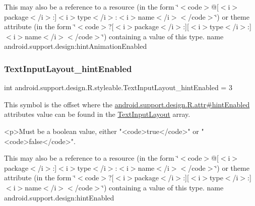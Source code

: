 This may also be a reference to a resource (in the form \char`\"{}$<$code$>$@\mbox{[}$<$i$>$package$<$/i$>$\+:\mbox{]}$<$i$>$type$<$/i$>$\+:$<$i$>$name$<$/i$>$$<$/code$>$\char`\"{}) or theme attribute (in the form \char`\"{}$<$code$>$?\mbox{[}$<$i$>$package$<$/i$>$\+:\mbox{]}\mbox{[}$<$i$>$type$<$/i$>$\+:\mbox{]}$<$i$>$name$<$/i$>$$<$/code$>$\char`\"{}) containing a value of this type.  name android.\+support.\+design\+:hint\+Animation\+Enabled \mbox{\label{classandroid_1_1support_1_1design_1_1R_1_1styleable_a164a51b99de4318938aea1e4cb2252a1}} 
\subsubsection{\texorpdfstring{Text\+Input\+Layout\+\_\+hint\+Enabled}{TextInputLayout\_hintEnabled}}
{\footnotesize\ttfamily int android.\+support.\+design.\+R.\+styleable.\+Text\+Input\+Layout\+\_\+hint\+Enabled = 3\hspace{0.3cm}{\ttfamily [static]}}

This symbol is the offset where the \hyperlink{classandroid_1_1support_1_1design_1_1R_1_1attr_afd69514a0f20d586a6ecea123884303c}{android.\+support.\+design.\+R.\+attr\#hint\+Enabled} attribute\textquotesingle{}s value can be found in the \hyperlink{classandroid_1_1support_1_1design_1_1R_1_1styleable_ae01fd2fce65dc8639f3898586b0cedcf}{Text\+Input\+Layout} array.

\begin{DoxyVerb}      <p>Must be a boolean value, either "<code>true</code>" or "<code>false</code>".
\end{DoxyVerb}
 

This may also be a reference to a resource (in the form \char`\"{}$<$code$>$@\mbox{[}$<$i$>$package$<$/i$>$\+:\mbox{]}$<$i$>$type$<$/i$>$\+:$<$i$>$name$<$/i$>$$<$/code$>$\char`\"{}) or theme attribute (in the form \char`\"{}$<$code$>$?\mbox{[}$<$i$>$package$<$/i$>$\+:\mbox{]}\mbox{[}$<$i$>$type$<$/i$>$\+:\mbox{]}$<$i$>$name$<$/i$>$$<$/code$>$\char`\"{}) containing a value of this type.  name android.\+support.\+design\+:hint\+Enabled \mbox{\label{classandroid_1_1support_1_1design_1_1R_1_1styleable_a2598a54f9e9d2a6238931ce0ae9b6bcc}} 
